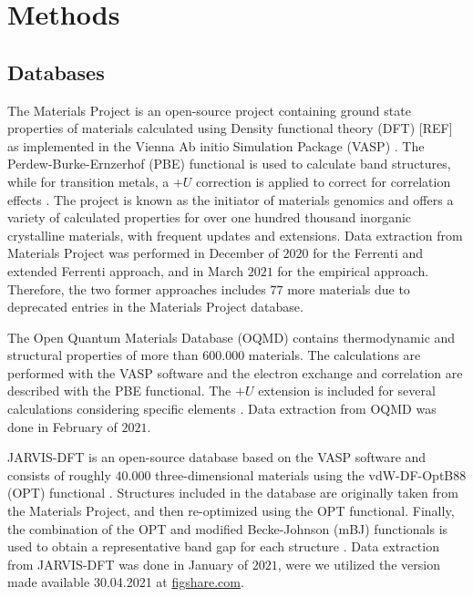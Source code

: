 \documentclass[superscriptaddress,unsortedaddress,
 amsmath,amssymb,
 aps,
]{revtex4-2}
\begin{document}
\section*{Methods}

\subsection*{Databases}
The Materials Project \cite{Jain2013, Jain2018} is an open-source project containing ground state properties of materials calculated using Density functional theory (DFT) [REF] as implemented in the Vienna Ab initio Simulation Package (VASP) \cite{Kresse1996}. The Perdew-Burke-Ernzerhof \cite{Perdew1996} (PBE) functional is used to calculate band structures, while for transition metals, a $+U$ correction is applied to correct for correlation effects \cite{Wang2006}. The project is known as the initiator of materials genomics and offers a variety of calculated properties for over one hundred thousand inorganic crystalline materials, with frequent updates and extensions. Data extraction from Materials Project was performed in December of $2020$ for the Ferrenti and extended Ferrenti approach, and in March $2021$ for the empirical approach. Therefore, the two former approaches includes $77$ more materials due to deprecated entries in the Materials Project database.

The Open Quantum Materials Database (OQMD) \cite{Saal2013, Kirklin2015} contains thermodynamic and structural properties of more than $600.000$  materials. The calculations are performed with the VASP software and the electron exchange and correlation are described with the PBE functional. The $+U$ extension is included for several calculations considering specific elements \cite{Stevanovic2012}. Data extraction from OQMD was done in February of $2021$. 

JARVIS-DFT \cite{Choudhary2020} is an open-source database based on the VASP software and consists of roughly $40.000$ three-dimensional materials using the vdW-DF-OptB88 (OPT) functional \cite{Thonhauser2007, Klimes2011}. Structures included in the database are originally taken from the Materials 
Project, and then re-optimized using the OPT functional. Finally, the combination of the OPT and modified Becke-Johnson (mBJ) functionals is used to obtain a representative band gap for each structure \cite{Choudhary2018a}. Data extraction from JARVIS-DFT was done in January of $2021$, were we utilized the version made available 30.04.2021 at \url{figshare.com}.
\end{document}
